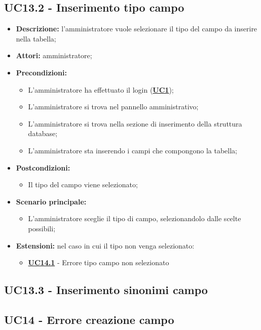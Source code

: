 \documentclass[5pt]{article}
\begin{document}
\subsection{UC13.2 - Inserimento tipo campo}
\label{sec:UC13.2}
\begin{itemize}
	\item \textbf{Descrizione:} l’amministratore vuole selezionare il tipo del campo da inserire nella tabella;
	\item \textbf{Attori:} amministratore;
	\item \textbf{Precondizioni:} 
	\begin{itemize}
		\item L’amministratore ha effettuato il login (\hyperref[sec:UC1]{\textbf{UC1}});
		\item L’amministratore si trova nel pannello amministrativo;
		\item L’amministratore si trova nella sezione di inserimento della struttura database;
		\item L’amministratore sta inserendo i campi che compongono la tabella;
	\end{itemize}
	\item \textbf{Postcondizioni:} 
	\begin{itemize}
		\item Il tipo del campo viene selezionato;
	\end{itemize}
	\item \textbf{Scenario principale:} 
	\begin{itemize}
		\item L’amministratore sceglie il tipo di campo, selezionandolo dalle scelte possibili;
	\end{itemize}
	\item \textbf{Estensioni:} nel caso in cui il tipo non venga selezionato:
	\begin{itemize}
		\item \hyperref[sec:UC14.1]{\textbf{UC14.1}} - Errore tipo campo non selezionato
	\end{itemize}
\end{itemize}

\subsection{UC13.3 - Inserimento sinonimi campo}
\label{sec:UC13.3}

\subsection{UC14 - Errore creazione campo}
\label{sec:UC14}
\end{document}
